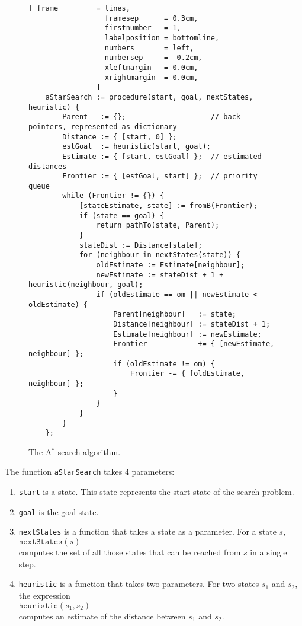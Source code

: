 \begin{figure}[!ht]
\centering
\begin{Verbatim}[ frame         = lines, 
                  framesep      = 0.3cm, 
                  firstnumber   = 1,
                  labelposition = bottomline,
                  numbers       = left,
                  numbersep     = -0.2cm,
                  xleftmargin   = 0.0cm,
                  xrightmargin  = 0.0cm,
                ]
    aStarSearch := procedure(start, goal, nextStates, heuristic) {
        Parent   := {};                    // back pointers, represented as dictionary
        Distance := { [start, 0] };
        estGoal  := heuristic(start, goal);
        Estimate := { [start, estGoal] };  // estimated distances
        Frontier := { [estGoal, start] };  // priority queue
        while (Frontier != {}) {
            [stateEstimate, state] := fromB(Frontier);
            if (state == goal) {
                return pathTo(state, Parent);
            }
            stateDist := Distance[state];
            for (neighbour in nextStates(state)) {
                oldEstimate := Estimate[neighbour];
                newEstimate := stateDist + 1 + heuristic(neighbour, goal);
                if (oldEstimate == om || newEstimate < oldEstimate) {
                    Parent[neighbour]   := state;
                    Distance[neighbour] := stateDist + 1;
                    Estimate[neighbour] := newEstimate;
                    Frontier            += { [newEstimate, neighbour] };
                    if (oldEstimate != om) {
                        Frontier -= { [oldEstimate, neighbour] };
                    }
                }
            }
        }
    };
\end{Verbatim}
\vspace*{-0.3cm}
\caption{The A$^*$ search algorithm.}
\label{fig:a-star-search.stlx}
\end{figure}
\noindent
The function \texttt{aStarSearch} takes 4 parameters:
\begin{enumerate}
\item \texttt{start} is a state.  This state represents the start state of the search problem.
\item \texttt{goal} is the goal state.  
\item \texttt{nextStates} is a function that takes a state as a parameter.  For a state $s$,
      \\[0.2cm]
      \hspace*{1.3cm}
      $\mathtt{nextStates}(s)$
      \\[0.2cm]
      computes the set of all those states that can be reached from $s$ in a single step.
\item \texttt{heuristic} is a function that takes two parameters.  
      For two states $s_1$ and $s_2$, the expression
      \\[0.2cm]
      \hspace*{1.3cm}
      $\texttt{heuristic}(s_1, s_2)$ 
      \\[0.2cm]
      computes an estimate of the distance between $s_1$ and $s_2$.
\end{enumerate}
